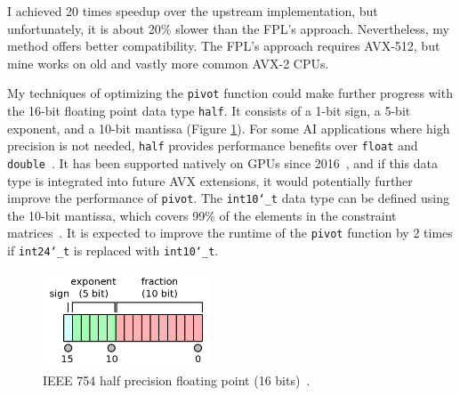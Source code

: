 \documentclass[logo,bsc,singlespacing,parskip]{infthesis}
\newcommand{\dthalfi}{\texttt{int10\char`_t}}
\newcommand{\dthalf}{\texttt{half}}
\newcommand{\dtfloat}{\texttt{float}}
\newcommand{\dtfloati}{\texttt{int24\char`_t}}
\newcommand{\dtdouble}{\texttt{double}}
\newcommand{\pivot}{\texttt{pivot}}
\begin{document}
I achieved 20 times speedup over the upstream implementation, but unfortunately, it is about 20\% slower than the FPL's approach. Nevertheless, my method offers better compatibility. The FPL's approach requires AVX-512, but mine works on old and vastly more common AVX-2 CPUs.

My techniques of optimizing the \texttt{pivot} function could make further progress with the 16-bit floating point data type \dthalf{}. It consists of a 1-bit sign, a 5-bit exponent, and a 10-bit mantissa (Figure \ref{fig:ieee-f16}). For some AI applications where high precision is not needed, \dthalf{} provides performance benefits over \dtfloat{} and \dtdouble{}~\cite{fp16-fast}. It has been supported natively on GPUs since 2016~\cite{pascal-intro-fp16}, and if this data type is integrated into future AVX extensions, it would potentially further improve the performance of \pivot{}. The \dthalfi{} data type can be defined using the 10-bit mantissa, which covers 99\% of the elements in the constraint matrices~\cite{FPL1}. It is expected to improve the runtime of the \pivot{} function by 2 times if \dtfloati{} is replaced with \dthalfi{}.


\begin{figure}[H]
    \begin{center}
    \includegraphics[width=50mm,scale=0.1]{image/ieee-f16.png}
    \end{center}
    \caption{IEEE 754 half precision floating point (16 bits)~\cite{fp16-diagram}.}
    \label{fig:ieee-f16}
\end{figure}
\end{document}
